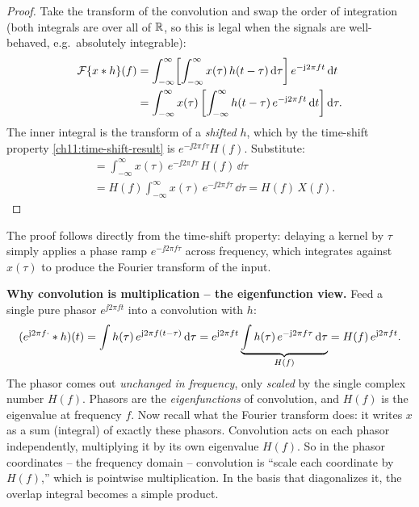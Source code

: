\begin{proof}
Take the transform of the convolution and swap the order of integration (both
integrals are over all of $\mathbb{R}$, so this is legal when the signals are
well-behaved, e.g.\ absolutely integrable):
\begin{align}
\mathcal{F}\{x \ast h\}(f)
&= \int_{-\infty}^{\infty}\!\left[\int_{-\infty}^{\infty} x(\tau)\,h(t-\tau)\,\mathrm{d}\tau\right]
   e^{-\mathrm{j} 2\pi f t}\, \mathrm{d} t \nonumber\\
&= \int_{-\infty}^{\infty} x(\tau)
   \left[\int_{-\infty}^{\infty} h(t-\tau)\, e^{-\mathrm{j} 2\pi f t}\, \mathrm{d} t\right] \mathrm{d}\tau.
\label{ch11:proof-swap}
\end{align}
The inner integral is the transform of a \emph{shifted} $h$, which by the
time-shift property \eqref{ch11:time-shift-result} is $e^{-\jj 2\pi f \tau}H(f)$.
Substitute:
\begin{align}
&= \int_{-\infty}^{\infty} x(\tau)\, e^{-\jj 2\pi f \tau}\, H(f)\, \dd\tau
\nonumber\\
&= H(f) \int_{-\infty}^{\infty} x(\tau)\, e^{-\jj 2\pi f \tau}\, \dd\tau
= H(f)\, X(f).
\end{align}
\end{proof}

The proof follows directly from the time-shift property: delaying a kernel by $\tau$ simply applies a phase ramp $e^{-\jj 2\pi f \tau}$ across frequency, which integrates against $x(\tau)$ to produce the Fourier transform of the input.

\begin{whybox}
\textbf{Why convolution is multiplication -- the eigenfunction view.} Feed a
single pure phasor $e^{\jj 2\pi f t}$ into a convolution with $h$:
\[
(e^{\mathrm{j} 2\pi f \cdot} \ast h)(t)
= \int h(\tau)\, e^{\mathrm{j} 2\pi f (t-\tau)}\,\mathrm{d}\tau
= e^{\mathrm{j} 2\pi f t}\underbrace{\int h(\tau)\, e^{-\mathrm{j} 2\pi f \tau}\,\mathrm{d}\tau}_{H(f)}
= H(f)\, e^{\mathrm{j} 2\pi f t}.
\]
The phasor comes out \emph{unchanged in frequency}, only \emph{scaled} by the
single complex number $H(f)$. Phasors are the \emph{eigenfunctions} of
convolution, and $H(f)$ is the eigenvalue at frequency $f$. Now recall what the
Fourier transform does: it writes $x$ as a sum (integral) of exactly these
phasors. Convolution acts on each phasor independently, multiplying it by its
own eigenvalue $H(f)$. So in the phasor coordinates -- the frequency domain --
convolution is ``scale each coordinate by $H(f)$,'' which is pointwise
multiplication. In the basis that diagonalizes it, the overlap integral becomes a
simple product.
\end{whybox}

